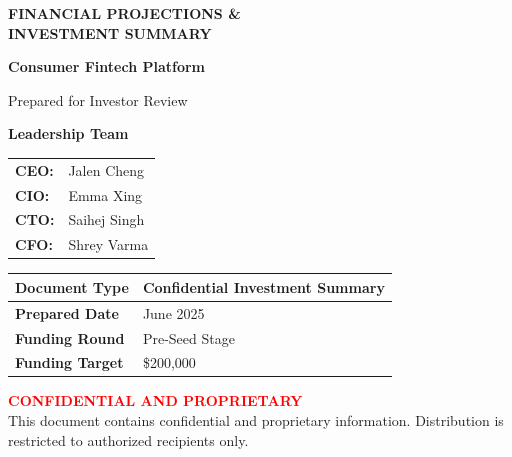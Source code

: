\documentclass[11pt,letterpaper]{article}
\begin{document}
\begin{titlepage}
\centering
\vspace*{2cm}

{\Huge\bfseries\color{primaryblue} FINANCIAL PROJECTIONS \& \\[0.3cm] INVESTMENT SUMMARY}

\vspace{1.5cm}

{\Large\textbf{Consumer Fintech Platform}}

\vspace{1cm}

{\large Prepared for Investor Review}

\vspace{1.5cm}

\begin{center}
\textbf{\large Leadership Team}

\vspace{0.5cm}

\begin{tabular}{ll}
\textbf{CEO:} & Jalen Cheng \\[0.2cm]
\textbf{CIO:} & Emma Xing \\[0.2cm]
\textbf{CTO:} & Saihej Singh \\[0.2cm]
\textbf{CFO:} & Shrey Varma \\
\end{tabular}
\end{center}

\vspace{2cm}

\begin{tabular}{|l|l|}
\hline
\textbf{Document Type} & Confidential Investment Summary \\
\hline
\textbf{Prepared Date} & June 2025 \\
\hline
\textbf{Funding Round} & Pre-Seed Stage \\
\hline
\textbf{Funding Target} & \$200,000 \\
\hline
\end{tabular}

\vfill

\textcolor{red}{\textbf{CONFIDENTIAL AND PROPRIETARY}} \\
This document contains confidential and proprietary information. Distribution is restricted to authorized recipients only.

\end{titlepage}

\newpage
\end{document}
